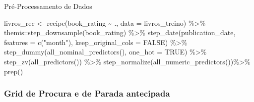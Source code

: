 \documentclass[
  9 pt,
  ignorenonframetext,
]{beamer}
\newenvironment{Shaded}{\begin{snugshade}}{\end{snugshade}}
\newcommand{\AttributeTok}[1]{\textcolor[rgb]{0.77,0.63,0.00}{#1}}
\newcommand{\ConstantTok}[1]{\textcolor[rgb]{0.00,0.00,0.00}{#1}}
\newcommand{\FunctionTok}[1]{\textcolor[rgb]{0.00,0.00,0.00}{#1}}
\newcommand{\NormalTok}[1]{#1}
\newcommand{\OtherTok}[1]{\textcolor[rgb]{0.56,0.35,0.01}{#1}}
\newcommand{\SpecialCharTok}[1]{\textcolor[rgb]{0.00,0.00,0.00}{#1}}
\newcommand{\StringTok}[1]{\textcolor[rgb]{0.31,0.60,0.02}{#1}}
\begin{document}
\begin{frame}[fragile]{Pré-Processamento de Dados}
\begin{Shaded}
\begin{Highlighting}[]
\NormalTok{livros\_rec }\OtherTok{\textless{}{-}} \FunctionTok{recipe}\NormalTok{(book\_rating }\SpecialCharTok{\textasciitilde{}}\NormalTok{ ., }\AttributeTok{data =}\NormalTok{ livros\_treino) }\SpecialCharTok{\%\textgreater{}\%}
\NormalTok{  themis}\SpecialCharTok{::}\FunctionTok{step\_downsample}\NormalTok{(book\_rating) }\SpecialCharTok{\%\textgreater{}\%} 
  \FunctionTok{step\_date}\NormalTok{(publication\_date, }\AttributeTok{features =} \FunctionTok{c}\NormalTok{(}\StringTok{"month"}\NormalTok{), }
            \AttributeTok{keep\_original\_cols =} \ConstantTok{FALSE}\NormalTok{) }\SpecialCharTok{\%\textgreater{}\%}
  \FunctionTok{step\_dummy}\NormalTok{(}\FunctionTok{all\_nominal\_predictors}\NormalTok{(), }\AttributeTok{one\_hot =} \ConstantTok{TRUE}\NormalTok{) }\SpecialCharTok{\%\textgreater{}\%}
  \FunctionTok{step\_zv}\NormalTok{(}\FunctionTok{all\_predictors}\NormalTok{()) }\SpecialCharTok{\%\textgreater{}\%} 
  \FunctionTok{step\_normalize}\NormalTok{(}\FunctionTok{all\_numeric\_predictors}\NormalTok{())}\SpecialCharTok{\%\textgreater{}\%} 
  \FunctionTok{prep}\NormalTok{()}
\end{Highlighting}
\end{Shaded}
\end{frame}

\hypertarget{grid-de-procura-e-de-parada-antecipada}{%
\subsubsection{Grid de Procura e de Parada
antecipada}\label{grid-de-procura-e-de-parada-antecipada}}
\end{document}
